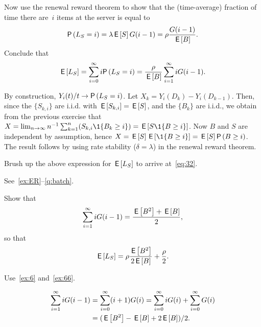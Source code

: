 \begin{exercise}
 Now use the renewal reward theorem to show that the (time-average) fraction of time there are~$i$ items at the server is equal to
 \begin{equation*}
 \P{L_S = i} = \lambda \E{S} G(i-1) = \rho \frac{G(i-1)}{\E B}.
 \end{equation*}
Conclude that
\begin{equation*}
 \E{L_S} = \sum_{i=0}^\infty i \P{L_S=i} = \frac{\rho}{\E B} \sum_{i=1}^\infty i G(i-1).
\end{equation*}
\begin{solution}
 By construction, $Y_i(t)/t \to \P{L_S=i}$.
 Let $X_k = Y_i(D_k) - Y_i(D_{k-1})$.
 Then, since the $\{S_{k, i}\}$ are i.i.d. with $\,\mathsf{E}\left[S_{k,i}\right] = \,\mathsf{E}\left[S\right]$, 
 and the $\{B_k\}$ are i.i.d., we obtain from the previous exercise that $X = \lim_{n\to\infty} n^{-1}\sum_{k=1}^n (S_{k,i} \1{B_{k} \geq i}) = \E{S \1{B\geq i}}$.
 Now $B$ and $S$ are independent by assumption, hence $X = \E{S} \E{\1{B\geq i}} = \E S \P{B\geq i}$.
 The result follows by using rate stability ($\delta = \lambda$) in the renewal reward theorem.
\end{solution}
\end{exercise}

\begin{exercise}
 Brush up the above expression for $\,\mathsf{E}\left[L_S\right]$ to arrive at~\cref{eq:32}.
\begin{solution}
 See~\cref{ex:ER}--\cref{q:batch}.
\end{solution}
\end{exercise}


\begin{extra}
 Show that
 \begin{equation*}
 \sum_{i=1}^\infty i G(i-1)= \frac{\,\mathsf{E}\left[B^2\right] + \,\mathsf{E}\left[B\right]}{2},
\end{equation*}
so that
\begin{equation*}
 \,\mathsf{E}\left[L_S\right] = \rho \frac{\,\mathsf{E}\left[B^2\right]}{2 \,\mathsf{E}\left[B\right]} + \frac{\rho}{2}.
\end{equation*}

\begin{hint}
 Use~\cref{ex:6} and~\cref{ex:66}.
\end{hint}
\begin{solution}
\begin{equation*}
 \begin{split}
 \sum_{i=1}^\infty i G(i-1) 
&=\sum_{i=0}^\infty (i+1) G(i) 
=\sum_{i=0}^\infty i G(i) +
\sum_{i=0}^\infty G(i)\\
&= (\,\mathsf{E}\left[B^2\right] - \,\mathsf{E}\left[B\right] + 2\,\mathsf{E}\left[B\right])/2.
 \end{split}
\end{equation*}
\end{solution}
\end{extra}


